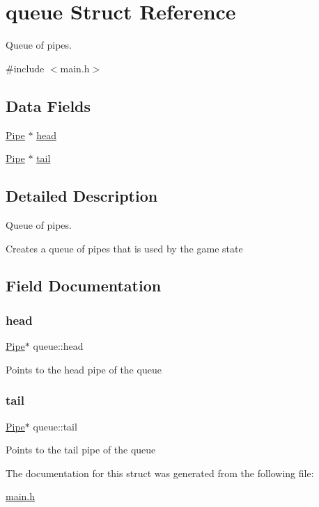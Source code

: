 \hypertarget{structqueue}{}\section{queue Struct Reference}
\label{structqueue}


Queue of pipes.  




{\ttfamily \#include $<$main.\+h$>$}

\subsection*{Data Fields}
\begin{DoxyCompactItemize}
\item 
\hyperlink{struct_pipe}{Pipe} $\ast$ \hyperlink{structqueue_a52df3ef3f6a262e44f861a66e2da20ad}{head}
\item 
\hyperlink{struct_pipe}{Pipe} $\ast$ \hyperlink{structqueue_a773415a5f961029cba2297a84a5015c0}{tail}
\end{DoxyCompactItemize}


\subsection{Detailed Description}
Queue of pipes. 

Creates a queue of pipes that is used by the game state 

\subsection{Field Documentation}
\mbox{\label{structqueue_a52df3ef3f6a262e44f861a66e2da20ad}} 
\subsubsection{\texorpdfstring{head}{head}}
{\footnotesize\ttfamily \hyperlink{struct_pipe}{Pipe}$\ast$ queue\+::head}

Points to the head pipe of the queue \mbox{\label{structqueue_a773415a5f961029cba2297a84a5015c0}} 
\subsubsection{\texorpdfstring{tail}{tail}}
{\footnotesize\ttfamily \hyperlink{struct_pipe}{Pipe}$\ast$ queue\+::tail}

Points to the tail pipe of the queue 

The documentation for this struct was generated from the following file\+:\begin{DoxyCompactItemize}
\item 
\hyperlink{main_8h}{main.\+h}\end{DoxyCompactItemize}
